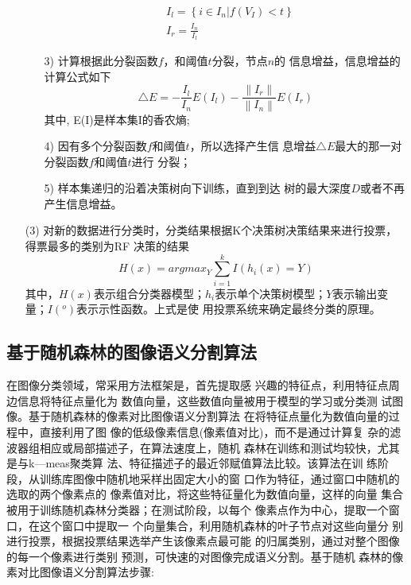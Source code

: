 \documentclass[UTF8,a4paper,10pt,nocolorlinks]{ctexart}
\begin{document}
\begin{multicols}{2}
\begin{itemize}
\begin{itemize}
\begin{align}
                    & I_{l} = \left\{ i \in I_{n} | f(V_{I}) < t \right\} \\
                    & I_{r} = \frac{I_{n}}{I_{l}}
                    \label{equ:2}
                \end{align}
                \item[3)] 计算根据此分裂函数$f$，和阈值$t$分裂，节点$n$的
                信息增益，信息增益的计算公式如下
                \begin{equation}
                    \triangle E = -\frac{I_{l}}{I_{n}} E(I_{l}) - \frac{\left\| I_{r} \right\|}{\left\| I_{n} \right\|} E(I_{r})
                    \label{equ:4}
                \end{equation}
                其中, E(I)是样本集I的香农熵;
                \item[4)] 因有多个分裂函数$f$和阈值$t$，所以选择产生信
                息增益$\triangle E$最大的那一对分裂函数$f$和阈值$t$进行
                分裂；
                \item[5)] 样本集递归的沿着决策树向下训练，直到到达
                树的最大深度$D$或者不再产生信息增益。
            \end{itemize}
            \item[(3)] 对新的数据进行分类时，分类结果根据K个决策树决策结果来进行投票，得票最多的类别为RF
            决策的结果
            \begin{equation}
                H(x) = argmax_{Y} \sum_{i=1}^k I(h_i (x) = Y)
            \end{equation}
            其中，$H(x)$表示组合分类器模型；$h_{i}$表示单个决策树模型；$Y$表示输出变量；$I(^o)$表示示性函数。上式是使
用投票系统来确定最终分类的原理。
    \end{itemize}
    
    \subsection{基于随机森林的图像语义分割算法}
    在图像分类领域，常采用方法框架是，首先提取感
兴趣的特征点，利用特征点周边信息将特征点量化为
数值向量，这些数值向量被用于模型的学习或分类测
试图像。基于随机森林的像素对比图像语义分割算法
在将特征点量化为数值向量的过程中，直接利用了图
像的低级像素信息(像素值对比)，而不是通过计算复
杂的滤波器组相应或局部描述子，在算法速度上，随机
森林在训练和测试均较快，尤其是与k—meas聚类算
法、特征描述子的最近邻赋值算法比较。该算法在训
练阶段，从训练库图像中随机地采样出固定大小的窗
口作为特征，通过窗口中随机的选取的两个像素点的
像素值对比，将这些特征量化为数值向量，这样的向量
集合被用于训练随机森林分类器；在测试阶段，以每个
像素点作为中心，提取一个窗口，在这个窗口中提取一
个向量集合，利用随机森林的叶子节点对这些向量分
别进行投票，根据投票结果选举产生该像素点最可能
的归属类别，通过对整个图像的每一个像素进行类别
预测，可快速的对图像完成语义分割。基于随机
森林的像素对比图像语义分割算法步骤:

\end{multicols}
\end{document}
